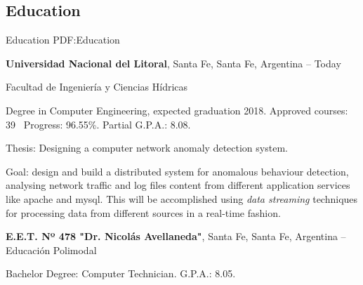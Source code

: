 \documentclass[letterpaper,MMMyyyy,nonstop]{simpleresumecv}
\begin{document}
\begin{body}


\section
{Education}
{Education}
{PDF:Education}

\textbf{Universidad Nacional del Litoral},
Santa Fe, Santa Fe, Argentina
\hfill
{} --
Today

\BulletItem Facultad de Ingeniería y Ciencias Hídricas
\begin{detail}
	\SubBulletItem
	Degree in Computer Engineering, expected graduation 2018.
	\SubBulletItem
	Approved courses: 39 \SubBulletSymbol\, Progress: 96.55\%.
	\SubBulletItem Partial G.P.A.: 8.08.

\end{detail}
\BulletItem	Thesis: Designing a computer network anomaly detection system.
\begin{detail}
	\SubBulletItem
	Goal: design and build a distributed system for anomalous behaviour detection, analysing network traffic and log files content from different application services like apache and mysql. This will be accomplished using \textit{data streaming} techniques for processing data from different sources in a real-time fashion.
	
\end{detail}

\BigGap
\textbf{E.E.T. Nº 478 "Dr. Nicolás Avellaneda"},
Santa Fe, Santa Fe, Argentina
\hfill
{} --
\BulletItem Educación Polimodal
\begin{detail}
	\SubBulletItem
	Bachelor Degree: Computer Technician.
	\SubBulletItem
	G.P.A.: 8.05.
\end{detail}

%
%



\end{body}
\end{document}
